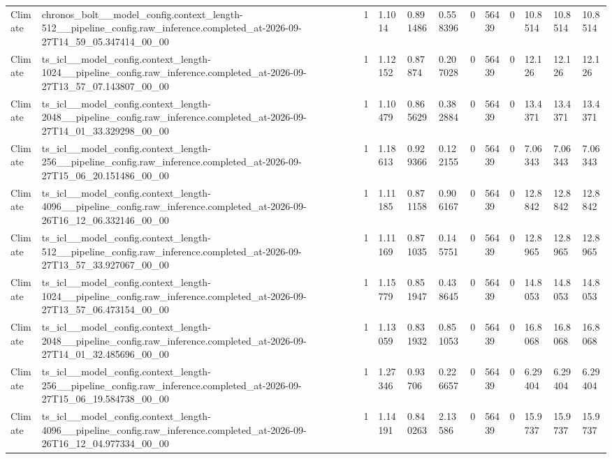 \begin{tabular}{llllllllllll}
Climate & chronos\_bolt\_\_model\_config.context\_length-512\_\_pipeline\_config.raw\_inference.completed\_at-2026-09-27T14\_59\_05.347414\_00\_00 & 1 & 1.1014 & 0.891486 & 0.558396 & 0 & 56439 & 0 & 10.8514 & 10.8514 & 10.8514 \\
Climate & ts\_icl\_\_model\_config.context\_length-1024\_\_pipeline\_config.raw\_inference.completed\_at-2026-09-27T13\_57\_07.143807\_00\_00 & 1 & 1.12152 & 0.87874 & 0.207028 & 0 & 56439 & 0 & 12.126 & 12.126 & 12.126 \\
Climate & ts\_icl\_\_model\_config.context\_length-2048\_\_pipeline\_config.raw\_inference.completed\_at-2026-09-27T14\_01\_33.329298\_00\_00 & 1 & 1.10479 & 0.865629 & 0.382884 & 0 & 56439 & 0 & 13.4371 & 13.4371 & 13.4371 \\
Climate & ts\_icl\_\_model\_config.context\_length-256\_\_pipeline\_config.raw\_inference.completed\_at-2026-09-27T15\_06\_20.151486\_00\_00 & 1 & 1.18613 & 0.929366 & 0.122155 & 0 & 56439 & 0 & 7.06343 & 7.06343 & 7.06343 \\
Climate & ts\_icl\_\_model\_config.context\_length-4096\_\_pipeline\_config.raw\_inference.completed\_at-2026-09-26T16\_12\_06.332146\_00\_00 & 1 & 1.11185 & 0.871158 & 0.906167 & 0 & 56439 & 0 & 12.8842 & 12.8842 & 12.8842 \\
Climate & ts\_icl\_\_model\_config.context\_length-512\_\_pipeline\_config.raw\_inference.completed\_at-2026-09-27T13\_57\_33.927067\_00\_00 & 1 & 1.11169 & 0.871035 & 0.145751 & 0 & 56439 & 0 & 12.8965 & 12.8965 & 12.8965 \\
Climate & ts\_icl\_\_model\_config.context\_length-1024\_\_pipeline\_config.raw\_inference.completed\_at-2026-09-27T13\_57\_06.473154\_00\_00 & 1 & 1.15779 & 0.851947 & 0.438645 & 0 & 56439 & 0 & 14.8053 & 14.8053 & 14.8053 \\
Climate & ts\_icl\_\_model\_config.context\_length-2048\_\_pipeline\_config.raw\_inference.completed\_at-2026-09-27T14\_01\_32.485696\_00\_00 & 1 & 1.13059 & 0.831932 & 0.851053 & 0 & 56439 & 0 & 16.8068 & 16.8068 & 16.8068 \\
Climate & ts\_icl\_\_model\_config.context\_length-256\_\_pipeline\_config.raw\_inference.completed\_at-2026-09-27T15\_06\_19.584738\_00\_00 & 1 & 1.27346 & 0.93706 & 0.226657 & 0 & 56439 & 0 & 6.29404 & 6.29404 & 6.29404 \\
Climate & ts\_icl\_\_model\_config.context\_length-4096\_\_pipeline\_config.raw\_inference.completed\_at-2026-09-26T16\_12\_04.977334\_00\_00 & 1 & 1.14191 & 0.840263 & 2.13586 & 0 & 56439 & 0 & 15.9737 & 15.9737 & 15.9737 \\

\end{tabular}
